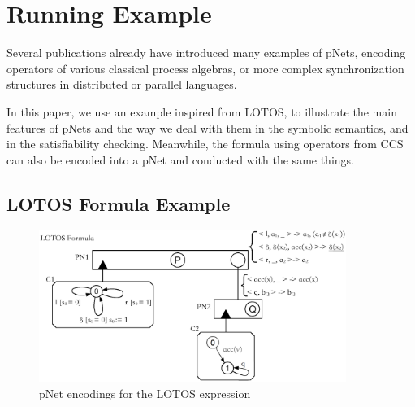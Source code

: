 \documentclass{lncs/llncs}
\newcommand{\QIN}[1]{\textcolor{airforceblue}{#1}}
\begin{document}




\section{Running Example}
\label{section:examples}

Several publications \cite{HMZ:PDP15,henrio:Forte2016} already have introduced
many examples of pNets, encoding
operators of various classical process algebras, or more complex
synchronization structures in distributed or parallel languages.

In this paper, we use an example inspired from LOTOS, to illustrate
the main features of pNets and the way we deal with them in the symbolic
semantics, and in the satisfiability checking. 
\QIN{
Meanwhile, 
the formula using operators from CCS can also be encoded into a pNet and 
conducted with the same things.
}

\subsection{LOTOS Formula Example}

\begin{figure}[h]
  \centerline{\includegraphics[width=10cm]{XFIG/LOTOSFormula.eps}}
  \caption{pNet encodings for the LOTOS expression}  \label{schema:lotos-pnet}
\end{figure}
\end{document}
